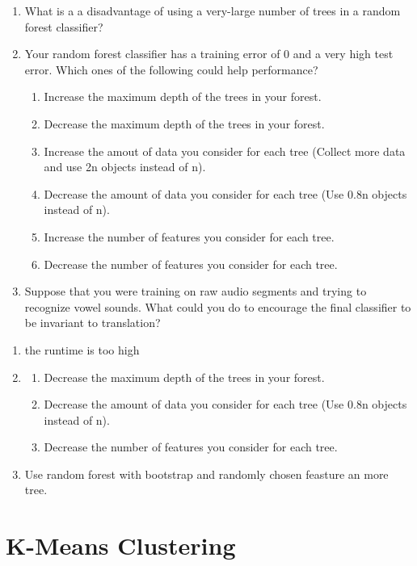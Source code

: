 \documentclass{article}
\def\blu#1{{\color{blu}#1}}
\def\enum#1{\begin{enumerate}#1\end{enumerate}}
\begin{document}
\blu{\enum{
\item What is a a disadvantage of using a very-large number of trees in a random forest classifier?
\item Your random forest classifier has a training error of 0 and a very high test error. Which ones of the following could help performance?
\enum{
\item Increase the maximum depth of the trees in your forest.
\item Decrease the maximum depth of the trees in your forest.
\item Increase the amout of data you consider for each tree (Collect more data and use 2n objects instead of n).
\item Decrease the amount of data you consider for each tree (Use 0.8n objects instead of n).
\item Increase the number of features you consider for each tree.
\item Decrease the number of features you consider for each tree.
}
\item Suppose that you were training on raw audio segments and trying to recognize vowel sounds. What could you do to encourage the final classifier to be invariant to translation?
}
}


\begin{enumerate}
\item the runtime is too high
\item 
\begin{enumerate}
     \item Decrease the maximum depth of the trees in your forest.
    \item Decrease the amount of data you consider for each tree (Use 0.8n objects instead of n).
    \item Decrease the number of features you consider for each tree.
    \end{enumerate}
 \item Use random forest with bootstrap and randomly chosen feasture an more tree.
 
\end{enumerate}


\section{K-Means Clustering}
\end{document}
